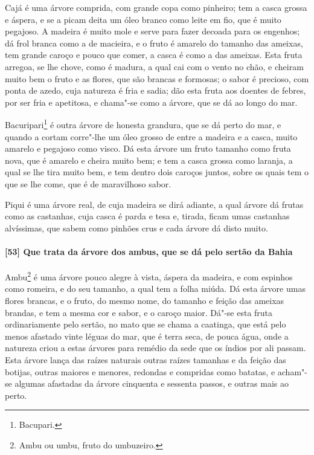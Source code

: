 Cajá é uma árvore comprida, com grande copa como pinheiro; tem a casca grossa e áspera, e
se a picam deita um óleo branco como leite em fio, que é muito pegajoso. A madeira é muito
mole e serve para fazer decoada para os engenhos; dá frol branca como a de macieira, e o
fruto é amarelo do tamanho das ameixas, tem grande caroço e pouco que comer, a casca é
como a das ameixas. Esta fruta arregoa, se lhe chove, como é madura, a qual cai com o
vento no chão, e cheiram muito bem o fruto e as flores, que são brancas e formosas; o
sabor é precioso, com ponta de azedo, cuja natureza é fria e sadia; dão esta fruta aos
doentes de febres, por ser fria e apetitosa, e chama"-se como a árvore, que se dá ao longo
do mar.

Bacuripari\footnote{ Bacupari.} é outra árvore de honesta grandura, que se dá perto do
mar, e quando a cortam corre"-lhe um óleo grosso de entre a madeira e a casca, muito
amarelo e pegajoso como visco. Dá esta árvore um fruto tamanho como fruta nova, que é
amarelo e cheira muito bem; e tem a casca grossa como laranja, a qual se lhe tira muito
bem, e tem dentro dois caroços juntos, sobre os quais tem o que se lhe come, que é de
maravilhoso sabor.

Piqui é uma árvore real, de cuja madeira se dirá adiante, a qual árvore dá frutas como as
castanhas, cuja casca é parda e tesa e, tirada, ficam umas castanhas alvíssimas, que sabem
como pinhões crus e cada árvore dá disto muito.

\paragraph{[53] Que trata da árvore dos ambus, que se dá pelo sertão da Bahia}\quad
Ambu\footnote{ Ambu ou umbu, fruto do umbuzeiro.} é uma árvore pouco alegre à vista,
áspera da madeira, e com espinhos como romeira, e do seu tamanho, a qual tem a folha
miúda. Dá esta árvore umas flores brancas, e o fruto, do mesmo nome, do tamanho e feição
das ameixas brandas, e tem a mesma cor e sabor, e o caroço maior. Dá"-se esta fruta
ordinariamente pelo sertão, no mato que se chama a caatinga, que está pelo menos afastado
vinte léguas do mar, que é terra seca, de pouca água, onde a natureza criou a estas
árvores para remédio da sede que os índios por ali passam. Esta árvore lança das raízes
naturais outras raízes tamanhas e da feição das botijas, outras maiores e menores,
redondas e compridas como batatas, e acham"-se algumas afastadas da árvore cinquenta e
sessenta passos, e outras mais ao perto.

